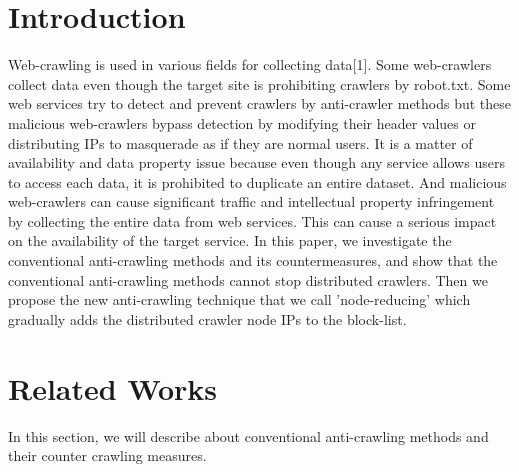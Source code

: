 \documentclass[sigconf,anonymous=true]{acmart}
\begin{document}
%
%
\section{Introduction}
Web-crawling is used in various fields for collecting data[1]. Some web-crawlers collect data even though the target site is prohibiting crawlers by robot.txt. Some web services try to detect and prevent crawlers by anti-crawler methods but these malicious web-crawlers bypass detection by modifying their header values or distributing IPs to masquerade as if they are normal users.
It is a matter of availability and data property issue because even though any service allows users to access each data, it is prohibited to duplicate an entire dataset. And malicious web-crawlers can cause significant traffic and intellectual property infringement by collecting the entire data from web services. This can cause a serious impact on the availability of the target service.
In this paper, we investigate the conventional anti-crawling methods and its countermeasures, and show that the conventional anti-crawling methods cannot stop distributed crawlers. Then we propose the new anti-crawling technique that we call 'node-reducing' which gradually adds the distributed crawler node IPs to the block-list.

%
%
\section{Related Works}
In this section, we will describe about conventional anti-crawling methods and their counter crawling measures.
\end{document}
